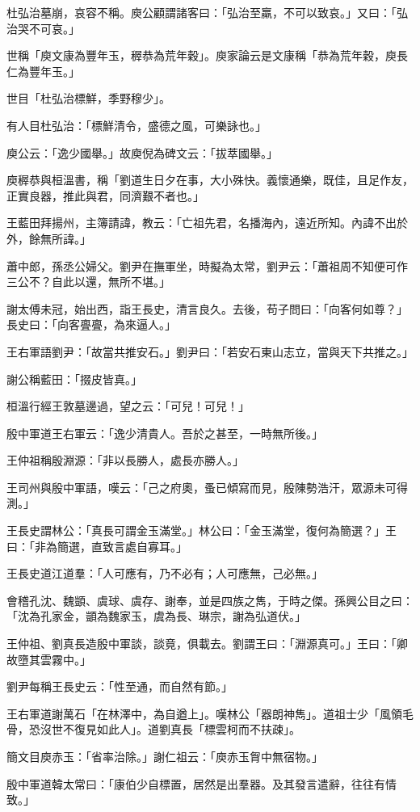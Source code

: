 杜弘治墓崩，哀容不稱。庾公顧謂諸客曰：「弘治至羸，不可以致哀。」又曰：「弘治哭不可哀。」

世稱「庾文康為豐年玉，稺恭為荒年穀」。庾家論云是文康稱「恭為荒年穀，庾長仁為豐年玉。」

世目「杜弘治標鮮，季野穆少」。

有人目杜弘治：「標鮮清令，盛德之風，可樂詠也。」

庾公云：「逸少國舉。」故庾倪為碑文云：「拔萃國舉。」

庾稺恭與桓溫書，稱「劉道生日夕在事，大小殊快。義懷通樂，既佳，且足作友，正實良器，推此與君，同濟艱不者也。」

王藍田拜揚州，主簿請諱，教云：「亡祖先君，名播海內，遠近所知。內諱不出於外，餘無所諱。」

蕭中郎，孫丞公婦父。劉尹在撫軍坐，時擬為太常，劉尹云：「蕭祖周不知便可作三公不？自此以還，無所不堪。」

謝太傅未冠，始出西，詣王長史，清言良久。去後，苟子問曰：「向客何如尊？」長史曰：「向客亹亹，為來逼人。」

王右軍語劉尹：「故當共推安石。」劉尹曰：「若安石東山志立，當與天下共推之。」

謝公稱藍田：「掇皮皆真。」

桓溫行經王敦墓邊過，望之云：「可兒！可兒！」

殷中軍道王右軍云：「逸少清貴人。吾於之甚至，一時無所後。」

王仲祖稱殷淵源：「非以長勝人，處長亦勝人。」

王司州與殷中軍語，嘆云：「己之府奧，蚤已傾寫而見，殷陳勢浩汗，眾源未可得測。」

王長史謂林公：「真長可謂金玉滿堂。」林公曰：「金玉滿堂，復何為簡選？」王曰：「非為簡選，直致言處自寡耳。」

王長史道江道羣：「人可應有，乃不必有；人可應無，己必無。」

會稽孔沈、魏顗、虞球、虞存、謝奉，並是四族之雋，于時之傑。孫興公目之曰：「沈為孔家金，顗為魏家玉，虞為長、琳宗，謝為弘道伏。」

王仲祖、劉真長造殷中軍談，談竟，俱載去。劉謂王曰：「淵源真可。」王曰：「卿故墮其雲霧中。」

劉尹每稱王長史云：「性至通，而自然有節。」

王右軍道謝萬石「在林澤中，為自遒上」。嘆林公「器朗神雋」。道祖士少「風領毛骨，恐沒世不復見如此人」。道劉真長「標雲柯而不扶疎」。

簡文目庾赤玉：「省率治除。」謝仁祖云：「庾赤玉胷中無宿物。」

殷中軍道韓太常曰：「康伯少自標置，居然是出羣器。及其發言遣辭，往往有情致。」

